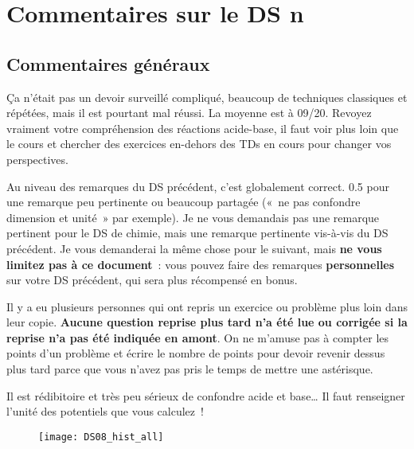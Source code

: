 \documentclass[a4paper, 11pt, final, garamond]{book}
\begin{document}
\setcounter{chapter}{7}

\def\lspace{25}

\chapter{Commentaires sur le DS n}
\section{Commentaires généraux}

Ça n'était pas un devoir surveillé compliqué, beaucoup de techniques classiques
et répétées, mais il est pourtant mal réussi. La moyenne est à 09/20. Revoyez
vraiment votre compréhension des réactions acide-base, il faut voir plus loin
que le cours et chercher des exercices en-dehors des TDs en cours pour changer
vos perspectives.

Au niveau des remarques du DS précédent, c'est globalement correct. \num{+0.5}
pour une remarque peu pertinente ou beaucoup partagée («~ne pas confondre
dimension et unité~» par exemple). Je ne vous demandais pas une remarque
pertinent pour le DS de chimie, mais une remarque pertinente vis-à-vis du DS
précédent. Je vous demanderai la même chose pour le suivant, mais \textbf{ne
	vous limitez pas à ce document}~: vous pouvez faire des remarques
\textbf{personnelles} sur votre DS précédent, qui sera plus récompensé en bonus.

Il y a eu plusieurs personnes qui ont repris un exercice ou problème plus loin
dans leur copie. \textbf{Aucune question reprise plus tard n'a été lue ou
	corrigée si la reprise n'a pas été indiquée en amont}. On ne m'amuse pas à
compter les points d'un problème et écrire le nombre de points pour devoir
revenir dessus plus tard parce que vous n'avez pas pris le temps de mettre une
astérisque.

Il est rédibitoire et très peu sérieux de confondre acide et base… Il faut
renseigner l'unité des potentiels que vous calculez~!

\begin{figure}[htbp!]
	\centering
	\texttt{[image: DS08\_hist\_all]}
\end{figure}

\setcounter{section}{0}
\end{document}
